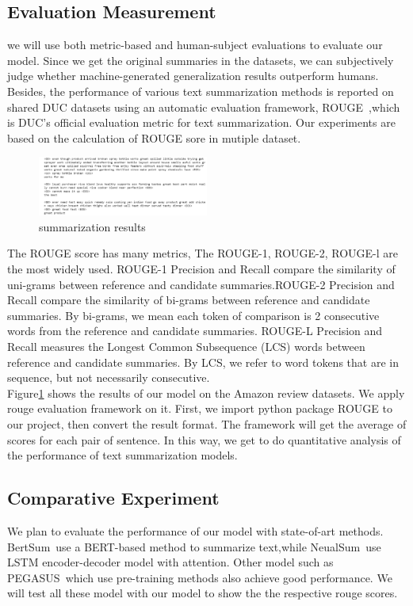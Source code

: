 \documentclass[conference]{IEEEtran}
\begin{document}
\subsection{Evaluation Measurement}
we will use both metric-based and human-subject evaluations to evaluate our model. Since we get the original summaries in the datasets, we can subjectively judge whether machine-generated generalization results outperform humans.  Besides, the performance of various text summarization methods is reported on shared DUC datasets using an automatic evaluation framework, ROUGE~\cite{lin-2004-rouge},which is DUC’s official evaluation metric for text summarization. Our experiments are based on the calculation of ROUGE sore in mutiple dataset.

\begin{figure}[h]
\centering
\includegraphics[width=0.5\textwidth]{imgs/Results.png}
\caption{summarization results}
\label{fig:Results}
\end{figure}
The ROUGE score has many metrics, The ROUGE-1, ROUGE-2, ROUGE-l are the most widely used. ROUGE-1 Precision and Recall compare the similarity of uni-grams between reference and candidate summaries.ROUGE-2 Precision and Recall compare the similarity of bi-grams between reference and candidate summaries. By bi-grams, we mean each token of comparison is 2 consecutive words from the reference and candidate summaries. ROUGE-L Precision and Recall measures the Longest Common Subsequence (LCS) words between reference and candidate summaries. By LCS, we refer to word tokens that are in sequence, but not necessarily consecutive. \\
Figure\ref{fig:Results} shows the results of our model on the Amazon review datasets. We apply rouge evaluation framework on it. First, we import python package ROUGE to our project, then convert the result format. The framework will get the average of scores for each pair of sentence. In this way, we get to do quantitative analysis of the performance of text summarization models.\\
\subsection{Comparative Experiment}
We plan to evaluate the performance of our model with state-of-art methods. BertSum~\cite{liu2019text}use a BERT-based method to summarize text,while NeualSum~\cite{cheng2016neural}use LSTM encoder-decoder model with attention. Other model such as PEGASUS~\cite{zhang1912pegasus}which use pre-training methods also achieve good performance. We will test all these model with our model to show the 
the respective rouge scores.



\end{document}
